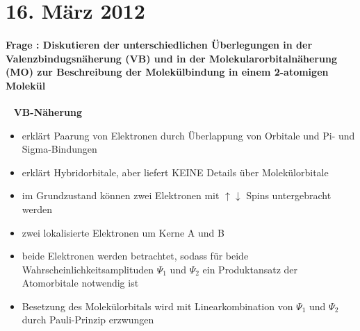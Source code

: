 \documentclass[a4paper, 11pt, ngerman, parskip=half-]{scrartcl}
\newcounter{question}
\newcommand{\question}[1]{\stepcounter{question}\paragraph{Frage \thequestion: #1}~}
\begin{document}
\section{16. März 2012}

\question{Diskutieren der unterschiedlichen Überlegungen in der Valenzbindugsnäherung (VB) und in der Molekularorbitalnäherung (MO) zur Beschreibung der Molekülbindung in einem 2-atomigen Molekül}
\label{q:41}
\textbf{VB-Näherung}
\begin{itemize}
   
    \item erklärt Paarung von Elektronen durch Überlappung von Orbitale und Pi- und Sigma-Bindungen
    \item erklärt Hybridorbitale, aber liefert KEINE Details über Molekülorbitale
    \item im Grundzustand können zwei Elektronen mit $\uparrow \downarrow$ Spins untergebracht werden
    \item zwei lokalisierte Elektronen um Kerne A und B
    \item beide Elektronen werden betrachtet, sodass für beide Wahrscheinlichkeitsamplituden $\Psi_1$ und $\Psi_2$ ein Produktansatz der Atomorbitale notwendig ist 
    \item Besetzung des Molekülorbitals wird mit Linearkombination von $\Psi_1$ und $\Psi_2$ durch Pauli-Prinzip erzwungen
\end{itemize}
\end{document}
